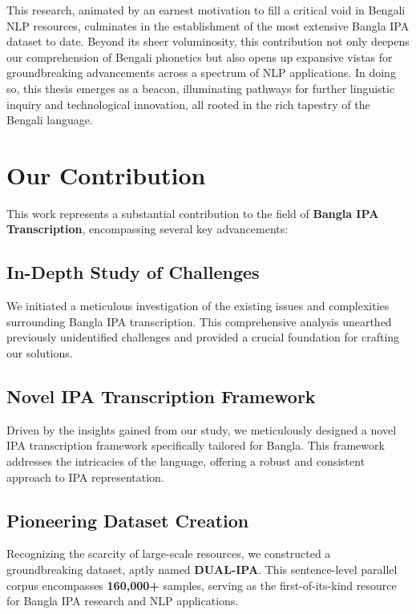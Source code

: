 \vspace{5mm}

This research, animated by an earnest motivation to fill a critical void in Bengali NLP resources, culminates in the establishment of the most extensive Bangla IPA dataset to date. Beyond its sheer voluminosity, this contribution not only deepens our comprehension of Bengali phonetics but also opens up expansive vistas for groundbreaking advancements across a spectrum of NLP applications. In doing so, this thesis emerges as a beacon, illuminating pathways for further linguistic inquiry and technological innovation, all rooted in the rich tapestry of the Bengali language.


\newpage
\section{Our Contribution}

This work represents a substantial contribution to the field of \textbf{Bangla IPA Transcription}, encompassing several key advancements:

\subsection{In-Depth Study of Challenges}

We initiated a meticulous investigation of the existing issues and complexities surrounding Bangla IPA transcription. This comprehensive analysis unearthed previously unidentified challenges and provided a crucial foundation for crafting our solutions.

\subsection{Novel IPA Transcription Framework}

Driven by the insights gained from our study, we meticulously designed a novel IPA transcription framework specifically tailored for Bangla. This framework addresses the intricacies of the language, offering a robust and consistent approach to IPA representation.

\subsection{Pioneering Dataset Creation}

Recognizing the scarcity of large-scale resources, we constructed a groundbreaking dataset, aptly named \textbf{DUAL-IPA}. This sentence-level parallel corpus encompasses \textbf{160,000+} samples, serving as the first-of-its-kind resource for Bangla IPA research and NLP applications.

